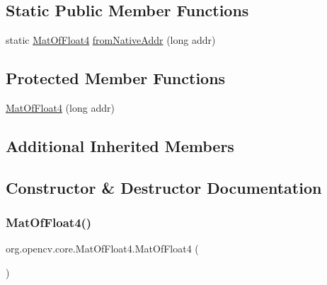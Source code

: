 \subsection*{Static Public Member Functions}
\begin{DoxyCompactItemize}
\item 
static \mbox{\hyperlink{classorg_1_1opencv_1_1core_1_1_mat_of_float4}{Mat\+Of\+Float4}} \mbox{\hyperlink{classorg_1_1opencv_1_1core_1_1_mat_of_float4_a2704983c4c772c0bf479203096a7e8c5}{from\+Native\+Addr}} (long addr)
\end{DoxyCompactItemize}
\subsection*{Protected Member Functions}
\begin{DoxyCompactItemize}
\item 
\mbox{\hyperlink{classorg_1_1opencv_1_1core_1_1_mat_of_float4_a337742d8197fad15c880207b517a87b6}{Mat\+Of\+Float4}} (long addr)
\end{DoxyCompactItemize}
\subsection*{Additional Inherited Members}


\subsection{Constructor \& Destructor Documentation}
\mbox{\label{classorg_1_1opencv_1_1core_1_1_mat_of_float4_a5ddf6bc24d5fbbe1677edf37cc1c37f7}} 
\subsubsection{\texorpdfstring{Mat\+Of\+Float4()}{MatOfFloat4()}\hspace{0.1cm}{\footnotesize\ttfamily [1/4]}}
{\footnotesize\ttfamily org.\+opencv.\+core.\+Mat\+Of\+Float4.\+Mat\+Of\+Float4 (\begin{DoxyParamCaption}{ }\end{DoxyParamCaption})}

\mbox{\label{classorg_1_1opencv_1_1core_1_1_mat_of_float4_a337742d8197fad15c880207b517a87b6}} 
